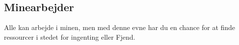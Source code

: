 \subsection*{Minearbejder}
Alle kan arbejde i minen, men med denne evne har du en chance for at finde ressourcer i stedet for ingenting eller Fjend.
